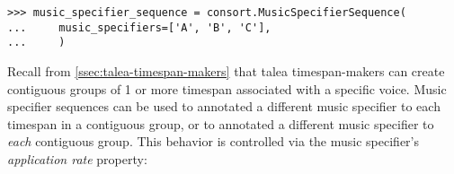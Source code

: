 \begin{comment}
<abjad>
music_specifier_sequence = consort.MusicSpecifierSequence(
    music_specifiers=['A', 'B', 'C'],
    )
</abjad>
\end{comment}

\begin{abjadbookoutput}
\begin{singlespacing}
\vspace{-0.5\baselineskip}
\begin{lstlisting}
>>> music_specifier_sequence = consort.MusicSpecifierSequence(
...     music_specifiers=['A', 'B', 'C'],
...     )
\end{lstlisting}
\end{singlespacing}
\end{abjadbookoutput}

\noindent Recall from \autoref{ssec:talea-timespan-makers} that talea
timespan-makers can create contiguous groups of 1 or more timespan associated
with a specific voice. Music specifier sequences can be used to annotated a
different music specifier to each timespan in a contiguous group, or to
annotated a different music specifier to \emph{each} contiguous group. This
behavior is controlled via the music specifier's \emph{application rate}
property:

\begin{comment}
<abjad>
music_specifiers = {'Voice': music_specifier_sequence}
target_timespan = timespantools.Timespan(0, (7, 4))
timespan_maker = consort.TaleaTimespanMaker(
    playing_groupings=(3,),
    )
timespan_inventory = timespan_maker(
    music_specifiers=music_specifiers,
    target_timespan=target_timespan,
    )
print(format(timespan_inventory))
</abjad>
\end{comment}

